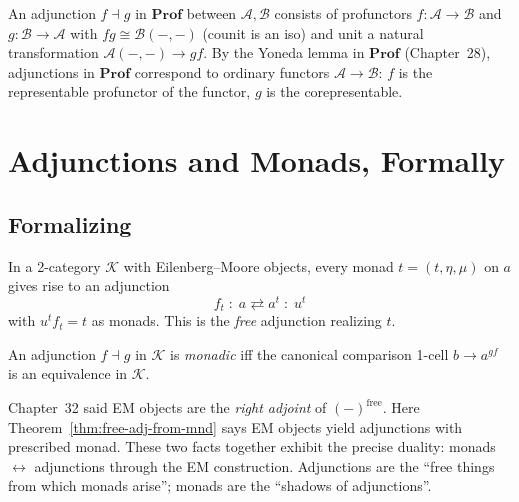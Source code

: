 \begin{example_thm}
An adjunction $f \dashv g$ in $\mathbf{Prof}$ between $\mathcal{A}, \mathcal{B}$
consists of profunctors $f : \mathcal{A} \to \mathcal{B}$ and
$g : \mathcal{B} \to \mathcal{A}$ with $f g \cong \mathcal{B}(-, -)$ (counit
is an iso) and unit a natural transformation $\mathcal{A}(-, -) \to gf$. By
the Yoneda lemma in $\mathbf{Prof}$ (Chapter~28), adjunctions in
$\mathbf{Prof}$ correspond to ordinary functors $\mathcal{A} \to \mathcal{B}$:
$f$ is the representable profunctor of the functor, $g$ is the corepresentable.
\end{example_thm}


\section{Adjunctions and Monads, Formally}
\label{sec:adj-mnd-formal}

\subsection{Formalizing}

\begin{theorem}
\label{thm:free-adj-from-mnd}
In a 2-category $\mathcal{K}$ with Eilenberg--Moore objects, every monad
$t = (t, \eta, \mu)$ on $a$ gives rise to an adjunction
\begin{equation*}
  f_t \;:\; a \rightleftarrows a^t \;:\; u^t
\end{equation*}
with $u^t f_t = t$ as monads. This is the \emph{free} adjunction realizing $t$.
\end{theorem}

\begin{theorem}
\label{thm:formal-monadicity}
An adjunction $f \dashv g$ in $\mathcal{K}$ is \emph{monadic} iff the canonical
comparison 1-cell $b \to a^{gf}$ is an equivalence in $\mathcal{K}$.
\end{theorem}

\begin{remark}
Chapter~32 said EM objects are the \emph{right adjoint} of $(-)^{\mathrm{free}}$.
Here Theorem~\ref{thm:free-adj-from-mnd} says EM objects yield adjunctions
with prescribed monad. These two facts together exhibit the precise duality:
monads $\leftrightarrow$ adjunctions through the EM construction. Adjunctions
are the ``free things from which monads arise''; monads are the ``shadows of
adjunctions''.
\end{remark}

